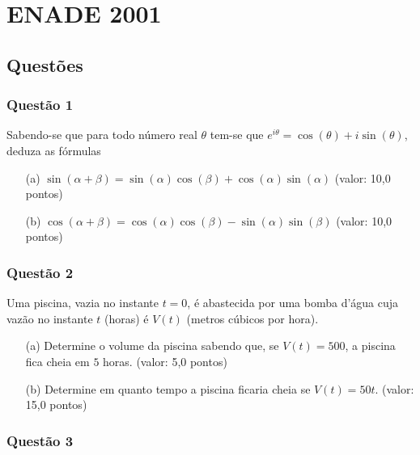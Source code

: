\documentclass{report}
\begin{document}
\chapter{ENADE 2001}

\section{\color{blue} Quest\~oes}

\subsection{\color{blue} Quest\~ao 1}

Sabendo-se que para todo n\'umero real $\theta$ tem-se que $e^{i\theta}= \cos (\theta) + i \sin (\theta)$, deduza as f\'ormulas

\begin{enumerate}

\item[(a)] $\sin (\alpha + \beta) = \sin (\alpha) \cos (\beta) + \cos (\alpha) \sin (\alpha)$ (valor: 10,0 pontos)

\item[(b)] $\cos (\alpha + \beta) = \cos (\alpha) \cos (\beta) - \sin (\alpha) \sin (\beta)$ (valor: 10,0 pontos)

\end{enumerate}

\subsection{\color{blue} Quest\~ao 2}

Uma piscina, vazia no instante $t = 0$, \'e abastecida por uma bomba d’\'agua cuja vaz\~ao no instante $t$ (horas) \'e $V(t)$ (metros c\'ubicos por hora).

\begin{enumerate}

\item[(a)] Determine o volume da piscina sabendo que, se $V(t) = 500$, a piscina fica cheia em $5$ horas. (valor: 5,0 pontos)

\item[(b)] Determine em quanto tempo a piscina ficaria cheia se $V(t) = 50 t$. (valor: 15,0 pontos)

\end{enumerate}

\subsection{\color{blue} Quest\~ao 3}
\end{document}
